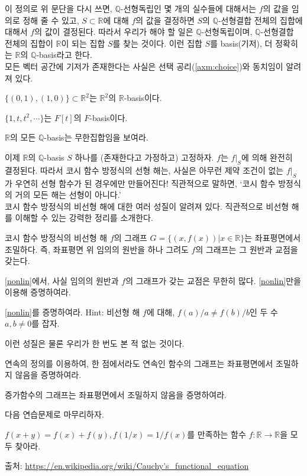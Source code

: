 이 정의로 위 문단을 다시 쓰면, $\mathbb{Q}$-선형독립인 몇 개의 실수들에 대해서는 $f$의 값을 임의로 정해 줄 수 있고, $S\subset \mathbb{R}$에 대해 $f$의 값을 결정하면 $S$의 $\mathbb{Q}$-선형결합 전체의 집합에 대해서 $f$의 값이 결정된다. 
따라서 우리가 해야 할 일은 $\mathbb{Q}$-선형독립이며, $\mathbb{Q}$-선형결합 전체의 집합이 $\mathbb{R}$이 되는 집합 $S$를 찾는 것이다. 이런 집합 $S$를 basis(기저), 더 정확히는 $\mathbb{R}$의 $\mathbb{Q}$-basis라고 한다. \\
모든 벡터 공간에 기저가 존재한다는 사실은 선택 공리(\cref{axm:choice})와 동치임이 알려져 있다. 
\begin{example}
$\{(0, 1), (1, 0)\}\subset \mathbb{R}^2$는 $\mathbb{R}^2$의 $\mathbb{R}$-basis이다. 
\end{example}
\begin{example}
$\{1, t, t^2, \cdots\}$는 $F[t]$의 $F$-basis이다. 
\end{example}
\begin{exercise}
$\mathbb{R}$의 모든 $\mathbb{Q}$-basis는 무한집합임을 보여라. 
\end{exercise}
이제 $\mathbb{R}$의 $\mathbb{Q}$-basis $S$ 하나를 (존재한다고 가정하고) 고정하자. $f$는 $f|_S$에 의해 완전히 결정된다. 따라서 코시 함수 방정식의 선형 해는, 사실은 아무런 제약 조건이 없는 $f|_S$가 우연히 선형 함수가 된 경우에만 만들어진다! 직관적으로 말하면, `코시 함수 방정식의 거의 모든 해는 선형이 아니다.'\\
코시 함수 방정식의 비선형 해에 대한 여러 성질이 알려져 있다. 직관적으로 비선형 해를 이해할 수 있는 강력한 정리를 소개한다. 
\begin{theorem}\label{nonlin}
코시 함수 방정식의 비선형 해 $f$의 그래프 $G=\{(x, f(x))|x\in \mathbb{R}\}$는 좌표평면에서 조밀하다. 즉, 좌표평면 위 임의의 원반을 하나 그려도 $f$의 그래프는 그 원반과 교점을 갖는다. 
\end{theorem}
\begin{exercise}
\cref{nonlin}에서, 사실 임의의 원반과 $f$의 그래프가 갖는 교점은 무한히 많다. \cref{nonlin}만을 이용해 증명하여라. 
\end{exercise}
\begin{exercise}
\cref{nonlin}를 증명하여라. Hint: 비선형 해 $f$에 대해, $f(a)/a\neq f(b)/b$인 두 수 $a, b\neq 0$를 잡자. 
\end{exercise}
이런 성질은 물론 우리가 한 번도 본 적 없는 것이다. 
\begin{exercise}
연속의 정의를 이용하여, 한 점에서라도 연속인 함수의 그래프는 좌표평면에서 조밀하지 않음을 증명하여라. 
\end{exercise}
\begin{exercise}
증가함수의 그래프는 좌표평면에서 조밀하지 않음을 증명하여라.
\end{exercise}
다음 연습문제로 마무리하자. 
\begin{exercise}
$f(x+y)=f(x)+f(y), f(1/x)=1/f(x)$를 만족하는 함수 $f: \mathbb{R}\to\mathbb{R}$을 모두 찾아라. 
\end{exercise}
출처: \url{https://en.wikipedia.org/wiki/Cauchy's_functional_equation}

